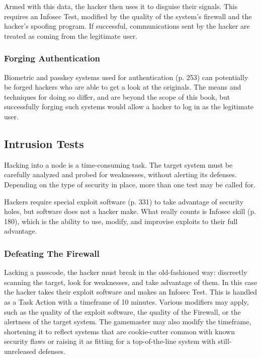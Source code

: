 Armed with this data, the hacker then uses it to 
disguise their signals. This requires an Infosec Test, 
modified by the quality of the system's firewall and 
the hacker's spoofing program. If successful, communications
sent by the hacker are treated as coming
from the legitimate user.

\subsubsection{Forging Authentication}

Biometric and passkey systems used for authentication 
(p. 253) can potentially be forged hackers who are 
able to get a look at the originals. The means and techniques
for doing so differ, and are beyond the scope of
this book, but successfully forging such systems would 
allow a hacker to log in as the legitimate user.

\subsection{Intrusion Tests}

Hacking into a node is a time-consuming task. The 
target system must be carefully analyzed and probed 
for weaknesses, without alerting its defenses. Depending
on the type of security in place, more than one test
may be called for.

Hackers require special exploit software (p. 331) to 
take advantage of security holes, but software does 
not a hacker make. What really counts is Infosec skill 
(p. 180), which is the ability to use, modify, and improvise
exploits to their full advantage.

\subsubsection{Defeating The Firewall}

Lacking a passcode, the hacker must break in the old-fashioned
way: discreetly scanning the target, look for
weaknesses, and take advantage of them. In this case 
the hacker takes their exploit software and makes an 
Infosec Test. This is handled as a Task Action with a 
timeframe of 10 minutes. Various modifiers may apply, 
such as the quality of the exploit software, the quality 
of the Firewall, or the alertness of the target system. The 
gamemaster may also modify the timeframe, shortening 
it to reflect systems that are cookie-cutter common with 
known security flaws or raising it as fitting for a top-of-the-line
system with still-unreleased defenses.

